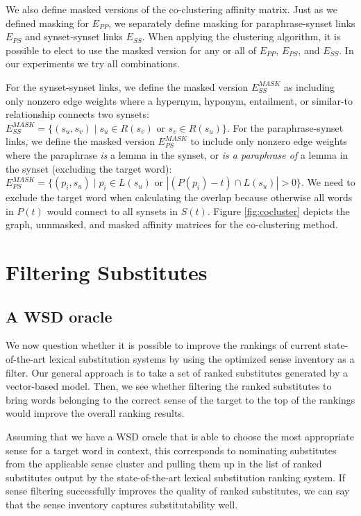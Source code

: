\documentclass[11pt]{article}
\begin{document}
We also define masked versions of the co-clustering affinity matrix. Just as we defined masking for $E_{PP}$, we separately define masking for paraphrase-synset links $E_{PS}$ and synset-synset links $E_{SS}$. When applying the clustering algorithm, it is possible to elect to use the masked version for any or all of $E_{PP}$, $E_{PS}$, and $E_{SS}$. In our experiments we try all combinations.

For the synset-synset links, we define the masked version $E_{SS}^{MASK}$ as including only nonzero edge weights where a hypernym, hyponym, entailment, or similar-to relationship connects two synsets: $E_{SS}^{MASK} = \{(s_u, s_v) \mid s_u \in R(s_v) \text{ or } s_v \in R(s_u)\}$. For the paraphrase-synset links, we define the masked version $E_{PS}^{MASK}$ to include only nonzero edge weights where the paraphrase \textit{is} a lemma in the synset, or \textit{is a paraphrase of} a lemma in the synset (excluding the target word): $E_{PS}^{MASK} = \{(p_i, s_u) \mid p_i \in L(s_u) \text{ or } |(P(p_i)-t) \cap L(s_u)| > 0 \}$. We need to exclude the target word when calculating the overlap because otherwise all words in $P(t)$ would connect to all synsets in $S(t)$. Figure \ref{fig:cocluster} depicts the graph, unnmasked, and masked affinity matrices for the co-clustering method. 


\section{Filtering Substitutes}

\subsection{A WSD oracle}

We now question whether it is possible to improve the rankings of current state-of-the-art lexical substitution systems by using the optimized sense inventory as a filter. Our general approach is to take a set of ranked substitutes generated by a vector-based model. Then, we see whether filtering the ranked substitutes to bring words belonging to the correct sense of the target to the top of the rankings would improve the overall ranking results. 

Assuming that we have a WSD oracle that is able to choose the most appropriate sense for a target word in context, this corresponds to nominating substitutes from the applicable sense cluster and pulling them up in the list of ranked substitutes output by the state-of-the-art lexical substitution ranking system. 
If sense filtering successfully improves the quality of ranked substitutes, we can say that the sense inventory captures substitutability well. 
\end{document}
